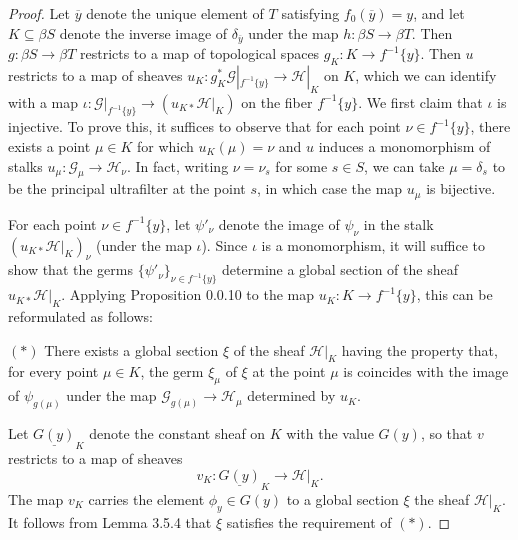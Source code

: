 \documentclass[11pt]{article}
\theoremstyle{plain}
\theoremstyle{definition}
\begin{document}
\begin{proof}
Let $\overline{y}$ denote the unique element of $T$ satisfying $f_0(\overline{y}) = y$, and let $K \subseteq \beta S$ denote the inverse image of $\delta_{\overline{y}}$ under the map $h : \beta S \to \beta T$. Then $g : \beta S \to \beta T$ restricts to a map of topological spaces $g_K : K \to f^{-1}\{y\}$. Then $u$ restricts to a map of sheaves $u_K : g_K^*\mathscr{G}|_{f^{-1}\{y\}} \to \mathscr{H}|_K$ on $K$, which we can identify with a map $\iota : \mathscr{G}|_{f^{-1}\{y\}} \to (u_{K*}\mathscr{H}|_K)$ on the fiber $f^{-1}\{y\}$. We first claim that $\iota$ is injective. To prove this, it suffices to observe that for each point $\nu \in f^{-1}\{y\}$, there exists a point $\mu \in K$ for which $u_K(\mu) = \nu$ and $u$ induces a monomorphism of stalks $u_\mu : \mathscr{G}_\mu \to \mathscr{H}_\nu$. In fact, writing $\nu = \nu_s$ for some $s \in S$, we can take $\mu = \delta_s$ to be the principal ultrafilter at the point $s$, in which case the map $u_\mu$ is bijective.

For each point $\nu \in f^{-1}\{y\}$, let $\psi'_\nu$ denote the image of $\psi_\nu$ in the stalk $(u_{K*}\mathscr{H}|_K)_\nu$ (under the map $\iota$). Since $\iota$ is a monomorphism, it will suffice to show that the germs $\{\psi'_\nu\}_{\nu \in f^{-1}\{y\}}$ determine a global section of the sheaf $u_{K*}\mathscr{H}|_K$. Applying Proposition 0.0.10 to the map $u_K : K \to f^{-1}\{y\}$, this can be reformulated as follows:

\smallskip
\noindent $(\ast)$ There exists a global section $\xi$ of the sheaf $\mathscr{H}|_K$ having the property that, for every point $\mu \in K$, the germ $\xi_\mu$ of $\xi$ at the point $\mu$ is coincides with the image of $\psi_{g(\mu)}$ under the map $\mathscr{G}_{g(\mu)} \to \mathscr{H}_\mu$ determined by $u_K$.
\smallskip

Let $\underline{G(y)}_K$ denote the constant sheaf on $K$ with the value $G(y)$, so that $v$ restricts to a map of sheaves
\[
v_K : \underline{G(y)}_K \to \mathscr{H}|_K.
\]
The map $v_K$ carries the element $\phi_y \in G(y)$ to a global section $\xi$ the sheaf $\mathscr{H}|_K$. It follows from Lemma 3.5.4 that $\xi$ satisfies the requirement of $(\ast)$.
\end{proof}
\end{document}
